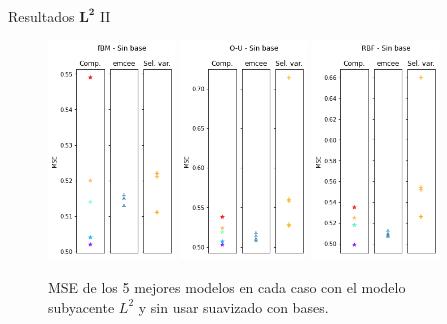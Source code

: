 \documentclass[10pt, spanish, professionalfonts]{beamer}
\begin{document}
\begin{frame}{Resultados \(\boldsymbol{L^2}\) II}
  \begin{figure}
    \includegraphics[width=0.3\textwidth]{img/results/lin_l2_fbm_nobase}\hfill
    \includegraphics[width=0.3\textwidth]{img/results/lin_l2_ou_nobase}\hfill
    \includegraphics[width=0.3\textwidth]{img/results/lin_l2_rbf_nobase}
    \caption{MSE de los 5 mejores modelos en cada caso con el modelo subyacente \(L^2\) y sin usar suavizado con bases.}
  \end{figure}
\end{frame}
\end{document}

